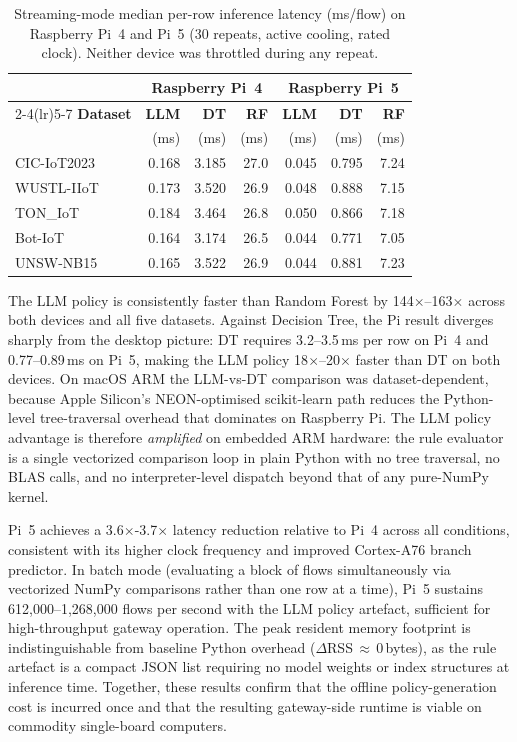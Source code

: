 \begin{table}[htbp]
\centering
\caption{Streaming-mode median per-row inference latency (ms/flow) on Raspberry Pi~4 and Pi~5
  (30 repeats, active cooling, rated clock). Neither device was throttled during any repeat.}
\label{tab:edge_latency}
\begin{tabular}{lrrr|rrr}
\toprule
 & \multicolumn{3}{c}{\textbf{Raspberry Pi~4}}
 & \multicolumn{3}{c}{\textbf{Raspberry Pi~5}} \\
\cmidrule(lr){2-4}\cmidrule(lr){5-7}
\textbf{Dataset} &
  \textbf{LLM} & \textbf{DT} & \textbf{RF} &
  \textbf{LLM} & \textbf{DT} & \textbf{RF} \\
 & (ms) & (ms) & (ms) & (ms) & (ms) & (ms) \\
\midrule
CIC-IoT2023  & 0.168 & 3.185 & 27.0 & 0.045 & 0.795 & 7.24 \\
WUSTL-IIoT   & 0.173 & 3.520 & 26.9 & 0.048 & 0.888 & 7.15 \\
TON\_IoT     & 0.184 & 3.464 & 26.8 & 0.050 & 0.866 & 7.18 \\
Bot-IoT      & 0.164 & 3.174 & 26.5 & 0.044 & 0.771 & 7.05 \\
UNSW-NB15    & 0.165 & 3.522 & 26.9 & 0.044 & 0.881 & 7.23 \\
\bottomrule
\end{tabular}
\end{table}

The LLM policy is consistently faster than Random Forest by 144$\times$--163$\times$ across both devices and all five datasets. Against Decision Tree, the Pi result diverges sharply from the desktop picture: DT requires 3.2--3.5\,ms per row on Pi~4 and 0.77--0.89\,ms on Pi~5, making the LLM policy 18$\times$--20$\times$ faster than DT on both devices. On macOS ARM the LLM-vs-DT comparison was dataset-dependent, because Apple Silicon's NEON-optimised scikit-learn path reduces the Python-level tree-traversal overhead that dominates on Raspberry Pi. The LLM policy advantage is therefore \emph{amplified} on embedded ARM hardware: the rule evaluator is a single vectorized comparison loop in plain Python with no tree traversal, no BLAS calls, and no interpreter-level dispatch beyond that of any pure-NumPy kernel.

Pi~5 achieves a 3.6$\times$-3.7$\times$ latency reduction relative to Pi~4 across all conditions, consistent with its higher clock frequency and improved Cortex-A76 branch predictor. In batch mode (evaluating a block of flows simultaneously via vectorized NumPy comparisons rather than one row at a time), Pi~5 sustains 612{,}000--1{,}268{,}000 flows per second with the LLM policy artefact, sufficient for high-throughput gateway operation. The peak resident memory footprint is indistinguishable from baseline Python overhead ($\Delta$RSS\,$\approx\,0$\,bytes), as the rule artefact is a compact JSON list requiring no model weights or index structures at inference time. Together, these results confirm that the offline policy-generation cost is incurred once and that the resulting gateway-side runtime is viable on commodity single-board computers.

